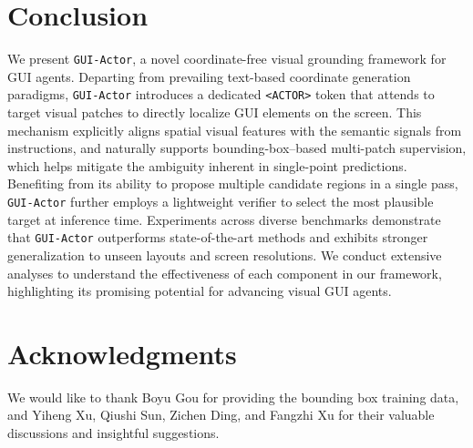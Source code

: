 \documentclass{article}
\newcommand{\huan}[1]{\textcolor{brown}{[Huan: #1]}}
\newcommand{\sys}{\texttt{GUI-Actor}\xspace}
\begin{document}
\section{Conclusion}
We present \sys, a novel coordinate-free visual grounding framework for GUI agents. %
Departing from prevailing text-based coordinate generation paradigms, \sys introduces a dedicated \texttt{<ACTOR>} token that attends to target visual patches to directly localize GUI elements on the screen.
This mechanism explicitly aligns spatial visual features with the semantic signals from instructions, and naturally supports bounding-box–based multi-patch supervision, which helps mitigate the ambiguity inherent in single-point predictions.
Benefiting from its ability to propose multiple candidate regions in a single pass, \sys further employs a lightweight verifier to select the most plausible target at inference time.
Experiments across diverse benchmarks demonstrate that \sys outperforms state-of-the-art methods and exhibits stronger generalization to unseen layouts and screen resolutions.
We conduct extensive analyses to understand the effectiveness of each component in our framework, highlighting its promising potential for advancing visual GUI agents.


\section*{Acknowledgments}
We would like to thank Boyu Gou for providing the bounding box training data, and Yiheng Xu, Qiushi Sun, Zichen Ding, and Fangzhi Xu for their valuable discussions and insightful suggestions.





\end{document}

